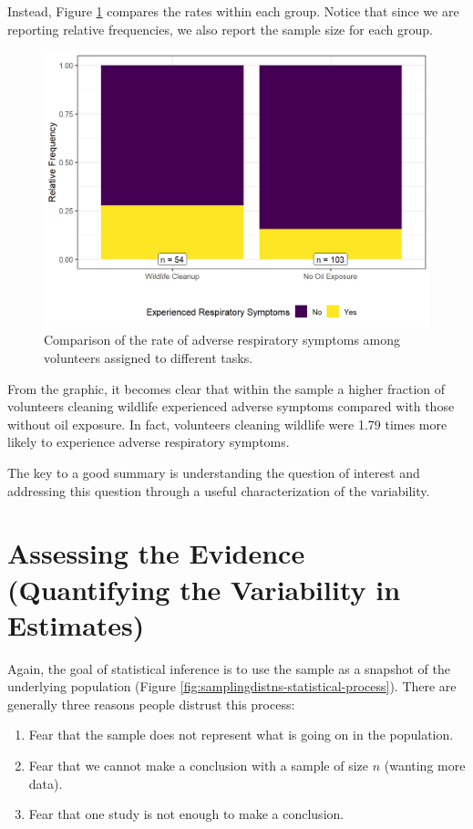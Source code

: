 \documentclass[
]{book}
\providecommand{\tightlist}{%
  \setlength{\itemsep}{0pt}\setlength{\parskip}{0pt}}
\theoremstyle{plain}
\theoremstyle{mydefn}
\theoremstyle{myexmpl}
\theoremstyle{remark}
\begin{document}
Instead, Figure \ref{fig:summaries-good-barchart} compares the rates within each group. Notice that since we are reporting relative frequencies, we also report the sample size for each group.

\begin{figure}

{\centering \includegraphics[width=0.8\linewidth]{./Images/summaries-good-barchart-1} 

}

\caption{Comparison of the rate of adverse respiratory symptoms among volunteers assigned to different tasks.}\label{fig:summaries-good-barchart}
\end{figure}

From the graphic, it becomes clear that within the sample a higher fraction of volunteers cleaning wildlife experienced adverse symptoms compared with those without oil exposure. In fact, volunteers cleaning wildlife were 1.79 times more likely to experience adverse respiratory symptoms.

The key to a good summary is understanding the question of interest and addressing this question through a useful characterization of the variability.

\hypertarget{SamplingDistns}{%
\chapter{Assessing the Evidence (Quantifying the Variability in Estimates)}\label{SamplingDistns}}

Again, the goal of statistical inference is to use the sample as a snapshot of the underlying population (Figure \ref{fig:samplingdistns-statistical-process}). There are generally three reasons people distrust this process:

\begin{enumerate}
\def\labelenumi{\arabic{enumi}.}
\tightlist
\item
  Fear that the sample does not represent what is going on in the population.
\item
  Fear that we cannot make a conclusion with a sample of size \(n\) (wanting more data).
\item
  Fear that one study is not enough to make a conclusion.
\end{enumerate}
\end{document}
